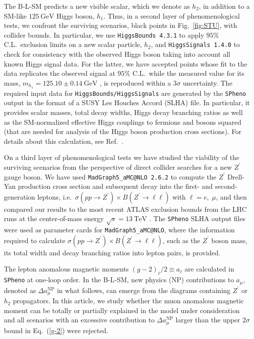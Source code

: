 \documentclass[a4paper,11pt]{article}
\renewcommand{\(}{\left(}
\renewcommand{\)}{\right)}
\renewcommand{\[}{\left[}
\renewcommand{\]}{\right]}
\newcommand{\ro}[1]{\textrm{#1}}
\begin{document}
The B-L-SM predicts a new visible scalar, which we denote as $h_2$, in addition to a SM-like $125~\ro{GeV}$ Higgs boson, $h_1$. Thus, in a second layer of phenomenological tests, we confront the surviving scenarios, black points in Fig.~\ref{fig:STU}, with collider bounds. In particular, we use \texttt{HiggsBounds 4.3.1} \cite{Bechtle:2013wla} to apply $95\%$ C.L.~exclusion limits on a new scalar particle, $h_2$, and \texttt{HiggsSignals 1.4.0} \cite{Bechtle:2013xfa} to check for consistency with the observed Higgs boson taking into account all known Higgs signal data. For the latter, we have accepted points whose fit to the data replicates the observed signal at $95\%$ C.L.~while the measured value for its mass, $m_{h_1} = 125.10 \pm 0.14~\ro{GeV}$ \cite{Tanabashi:2018oca}, is reproduced within a $3\sigma$ uncertainty. The required input data for \texttt{HiggsBounds/HiggsSignals} are generated by the \texttt{SPheno} output in the format of a SUSY Les Houches Accord (SLHA) \cite{Skands:2003cj} file. In particular, it provides scalar masses, total decay widths, Higgs decay branching ratios as well as the SM-normalized effective Higgs couplings to fermions and bosons squared (that are needed for analysis of the Higgs boson production cross sections). For details about this calculation, see Ref.~\cite{Bechtle:2013wla}.

On a third layer of phenomenological tests we have studied the viability of the surviving scenarios from the perspective of direct collider searches for a new $Z^\prime$ gauge boson. We have used \texttt{MadGraph5\_aMC@NLO 2.6.2} \cite{Alwall:2014hca} to compute the $Z^\prime$ Drell-Yan production cross section and subsequent decay into the first- and second-generation leptons, i.e.~$ \sigma\(pp \to Z^\prime\) \times B\(Z^\prime \to \ell \ell\)$ with $\ell = e,\; \mu$, and then compared our results to the most recent ATLAS exclusion bounds from the LHC runs at the center-of-mass energy $\sqrt{s} = 13~\ro{TeV}$ \cite{Aaboud:2017buh}. The \texttt{SPheno} SLHA output files were used as parameter cards for \texttt{MadGraph5\_aMC@NLO}, where the information required to calculate $ \sigma\(pp \to Z^\prime\) \times B\(Z^\prime \to \ell \ell\)$, such as the $Z^\prime$ boson mass, its total width and decay branching ratios into lepton pairs, is provided. 

The lepton anomalous magnetic moments $\(g-2\)_\ell /2 \equiv a_\ell$ are calculated in \texttt{SPheno} at one-loop order. In the B-L-SM, new physics (NP) contributions to $a_\mu$, denoted as $\Delta a_\mu^\ro{NP}$ in what follows, can emerge from the diagrams containing $Z^\prime$ or $h_2$ propagators. In this article, we study whether the muon anomalous magnetic moment can be totally or partially explained in the model under consideration and all scenarios with an excessive contribution to $\Delta a_\mu^\ro{NP}$ larger than the upper $2 \sigma$ bound in Eq.~(\ref{g-2}) were rejected.
\end{document}
